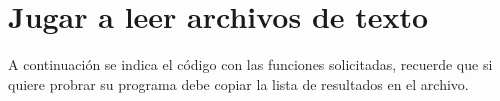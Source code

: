 \section{Jugar a leer archivos de texto}

A continuación se indica el código con las funciones solicitadas, recuerde que si quiere probrar su programa debe copiar la lista de resultados en el archivo.

